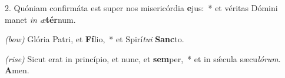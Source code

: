 2. Quóniam confirmáta est super nos misericórdia \textbf{e}jus:~*
	et véritas Dómini manet \textit{in} \textit{æ}\textbf{tér}num.

\textit{(bow)} Glória Patri, et \textbf{Fí}lio,~*
	et Spirí\textit{tu}\textit{i} \textbf{Sanc}to.

\textit{(rise)} Sicut erat in princípio, et nunc, et \textbf{sem}per,~*
	et in s\'{\ae}cula sæcu\textit{ló}\textit{rum}. \textbf{A}men.